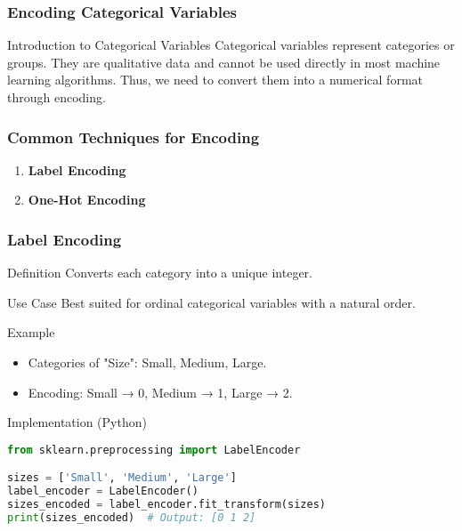 \documentclass[aspectratio=169]{beamer}
\begin{document}
\begin{frame}
    \frametitle{Encoding Categorical Variables}
    \begin{block}{Introduction to Categorical Variables}
        Categorical variables represent categories or groups. 
        They are qualitative data and cannot be used directly in most machine learning algorithms.
        Thus, we need to convert them into a numerical format through encoding.
    \end{block}
\end{frame}

\begin{frame}
    \frametitle{Common Techniques for Encoding}
    \begin{enumerate}
        \item \textbf{Label Encoding}
        \item \textbf{One-Hot Encoding}
    \end{enumerate}
\end{frame}

\begin{frame}[fragile]
    \frametitle{Label Encoding}
    \begin{block}{Definition}
        Converts each category into a unique integer. 
    \end{block}
    \begin{block}{Use Case}
        Best suited for ordinal categorical variables with a natural order.
    \end{block}
    \begin{block}{Example}
        \begin{itemize}
            \item Categories of "Size": Small, Medium, Large.
            \item Encoding: Small → 0, Medium → 1, Large → 2.
        \end{itemize}
    \end{block}
    \begin{block}{Implementation (Python)}
        \begin{lstlisting}[language=Python]
from sklearn.preprocessing import LabelEncoder

sizes = ['Small', 'Medium', 'Large']
label_encoder = LabelEncoder()
sizes_encoded = label_encoder.fit_transform(sizes)
print(sizes_encoded)  # Output: [0 1 2]
        \end{lstlisting}
    \end{block}
\end{frame}
\end{document}
